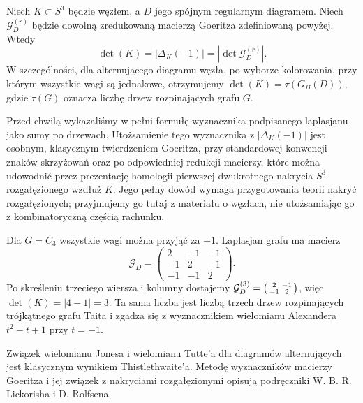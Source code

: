 \begin{twierdzenie}
Niech $K\subset S^3$ będzie węzłem, a $D$ jego
spójnym regularnym diagramem. Niech
$\mathcal G_D^{(r)}$ będzie dowolną zredukowaną
macierzą Goeritza zdefiniowaną powyżej. Wtedy
\[
\det(K)=|\Delta_K(-1)|=|\det\mathcal G_D^{(r)}|.
\]
W szczególności, dla alternującego diagramu węzła,
po wyborze kolorowania, przy którym wszystkie wagi
są jednakowe, otrzymujemy
$\det(K)=\tau(G_B(D))$, gdzie $\tau(G)$ oznacza
liczbę drzew rozpinających grafu $G$.
\end{twierdzenie}
\begin{uwaga}
Przed chwilą wykazaliśmy w pełni formułę wyznacznika
podpisanego laplasjanu jako sumy po drzewach.
Utożsamienie tego wyznacznika z $|\Delta_K(-1)|$
jest osobnym, klasycznym twierdzeniem Goeritza,
przy standardowej konwencji znaków skrzyżowań
oraz po odpowiedniej redukcji macierzy,
które można udowodnić przez prezentację homologii
pierwszej dwukrotnego nakrycia $S^3$ rozgałęzionego
wzdłuż $K$. Jego pełny dowód wymaga przygotowania
teorii nakryć rozgałęzionych; przyjmujemy go tutaj
z materiału o węzłach, nie utożsamiając go z
kombinatoryczną częścią rachunku.
\end{uwaga}

\begin{przyklad}
Dla $G=C_3$ wszystkie wagi można przyjąć za $+1$.
Laplasjan grafu ma macierz
\[
\mathcal G_D=\begin{pmatrix}
 2&-1&-1\\ -1&2&-1\\ -1&-1&2
\end{pmatrix}.
\]
Po skreśleniu trzeciego wiersza i kolumny dostajemy
$\mathcal G_D^{(3)}=\begin{psmallmatrix}2&-1\\-1&2\end{psmallmatrix}$,
więc $\det(K)=|4-1|=3$.
Ta sama liczba jest liczbą trzech drzew rozpinających
trójkątnego grafu Taita i zgadza się z wyznacznikiem
wielomianu Alexandera $t^2-t+1$ przy $t=-1$.
\end{przyklad}

\begin{uwaga}[Literatura]
Związek wielomianu Jonesa i wielomianu Tutte'a dla diagramów
alternujących jest klasycznym wynikiem Thistlethwaite'a.
Metodę wyznaczników macierzy Goeritza i jej związek z
nakryciami rozgałęzionymi opisują podręczniki
W. B. R. Lickorisha i D. Rolfsena.
\end{uwaga}


